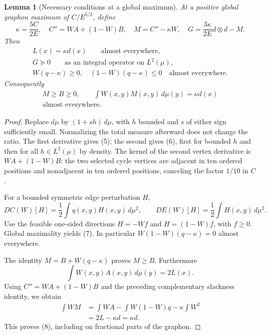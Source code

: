 \documentclass[11pt]{amsart}
\newtheorem{lemma}[theorem]{Lemma}
\theoremstyle{definition}
\theoremstyle{remark}
\begin{document}
\begin{lemma}[Necessary conditions at a global maximum]\label{lem:variations}
At a positive global graphon maximum of \(C/E^{5/2}\), define
\[
 \kappa=\frac{5C}{2E},\quad C''=WA+(1-W)B,\quad
 M=C''-\kappa W,\quad G=\frac{3\kappa}{2E}d\otimes d-M.
\]
Then
\begin{gather}
 L(x)=\kappa d(x)\qquad\text{almost everywhere},\tag{5}\\
 G\succeq0\qquad\text{as an integral operator on \(L^2(\mu)\)},\tag{6}\\
 W(q-\kappa)\ge0,\quad (1-W)(q-\kappa)\le0
       \quad\text{almost everywhere}.\tag{7}
\end{gather}
Consequently
\begin{equation}
 \begin{gathered}
 M\ge B\ge0,\qquad
 \int W(x,y)M(x,y)\,d\mu(y)=\kappa d(x)\\
 \text{almost everywhere}.
 \end{gathered}\tag{8}
\end{equation}
\end{lemma}
\begin{proof}
Replace \(d\mu\) by \((1+sh)\,d\mu\), with \(h\) bounded and \(s\) of
either sign sufficiently small. Normalizing the total measure afterward
does not change the ratio. The first derivative gives (5); the second gives
(6), first for bounded \(h\) and then for all \(h\in L^2(\mu)\) by density.
The kernel of the second vertex derivative is \(WA+(1-W)B\): the two
selected cycle vertices are adjacent in ten ordered positions and
nonadjacent in ten ordered positions, canceling the factor \(1/10\) in
\(C\).

For a bounded symmetric edge perturbation \(H\),
\[
 DC(W)[H]=\frac12\int q(x,y)H(x,y)\,d\mu^2,\qquad
 DE(W)[H]=\frac12\int H(x,y)\,d\mu^2.
\]
Use the feasible one-sided directions \(H=-Wf\) and \(H=(1-W)f\), with
\(f\ge0\). Global maximality yields (7). In particular
\(W(1-W)(q-\kappa)=0\) almost everywhere.

The identity \(M=B+W(q-\kappa)\) proves \(M\ge B\). Furthermore
\[
 \int W(x,y)A(x,y)\,d\mu(y)=2L(x).
\]
Using \(C''=WA+(1-W)B\) and the preceding complementary slackness
identity, we obtain
\begin{align*}
 \int WM
 &=\int WA-\int W(1-W)q-\kappa\int W^2\\
 &=2L-\kappa d=\kappa d.
\end{align*}
This proves (8), including on fractional parts of the graphon.
\end{proof}
\end{document}
